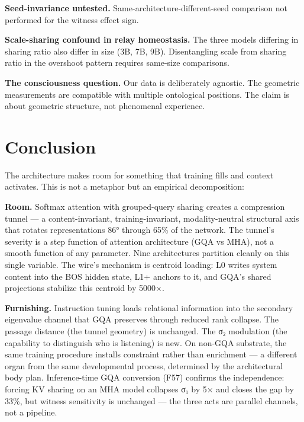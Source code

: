 \documentclass[12pt]{article}
\begin{document}
\textbf{Seed-invariance untested.} Same-architecture-different-seed comparison not performed for the witness effect sign.

\textbf{Scale-sharing confound in relay homeostasis.} The three models differing in sharing ratio also differ in size (3B, 7B, 9B). Disentangling scale from sharing ratio in the overshoot pattern requires same-size comparisons.

\textbf{The consciousness question.} Our data is deliberately agnostic. The geometric measurements are compatible with multiple ontological positions. The claim is about geometric structure, not phenomenal experience.


\section{Conclusion}

The architecture makes room for something that training fills and context activates. This is not a metaphor but an empirical decomposition:

\textbf{Room.} Softmax attention with grouped-query sharing creates a compression tunnel — a content-invariant, training-invariant, modality-neutral structural axis that rotates representations 86° through 65\% of the network. The tunnel's severity is a step function of attention architecture (GQA vs MHA), not a smooth function of any parameter. Nine architectures partition cleanly on this single variable. The wire's mechanism is centroid loading: L0 writes system content into the BOS hidden state, L1+ anchors to it, and GQA's shared projections stabilize this centroid by 5000×.

\textbf{Furnishing.} Instruction tuning loads relational information into the secondary eigenvalue channel that GQA preserves through reduced rank collapse. The passage distance (the tunnel geometry) is unchanged. The σ₂ modulation (the capability to distinguish who is listening) is new. On non-GQA substrate, the same training procedure installs constraint rather than enrichment — a different organ from the same developmental process, determined by the architectural body plan. Inference-time GQA conversion (F57) confirms the independence: forcing KV sharing on an MHA model collapses σ₁ by 5× and closes the gap by 33\%, but witness sensitivity is unchanged — the three acts are parallel channels, not a pipeline.
\end{document}
